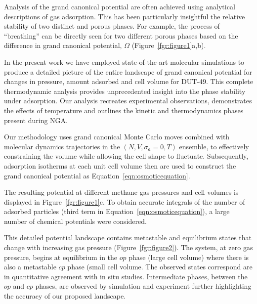\documentclass[journal=jacsat,manuscript=communication]{achemso}
\begin{document}
Analysis of the grand canonical potential are often achieved using analytical descriptions of gas adsorption.
This has been particularly insightful the relative stability of two distinct and porous phases.
For example, the process of ``breathing'' can be directly seen for two different porous phases based on the difference in grand canonical potential, $\Omega$ (Figure~\ref{fgr:figure1}a,b).

In the present work we have employed state-of-the-art molecular simulations to produce a detailed picture of the entire landscape of grand canonical potential for changes in pressure, amount adsorbed and cell volume for DUT-49.
This complete thermodynamic analysis provides unprecedented insight into the phase stability under adsorption.
Our analysis recreates experimental observations, demonstrates the effects of temperature and outlines the kinetic and thermodynamics phases present during NGA.



Our methodology uses grand canonical Monte Carlo moves combined with molecular dynamics trajectories in the $(N,V,\sigma_{a}=0,T)$ ensemble, to effectively constraining the volume while allowing the cell shape to fluctuate. Subsequently, adsorption isotherms at each unit cell volume then are used to construct the grand canonical potential as Equation~{\ref{eqn:osmoticequation}}.


The resulting potential at different methane gas pressures and cell volumes is displayed in Figure~\ref{fgr:figure1}c. To obtain accurate integrals of the number of adsorbed particles (third term in Equation~{\ref{eqn:osmoticequation}}), a large number of chemical potentials were considered.

This detailed potential landscape contains metastable and equilibrium states that change with  increasing gas pressure (Figure~\ref{fgr:figure2}). The system, at zero gas pressure, begins at equilibrium in the $op$ phase (large cell volume) where there is also a metastable $cp$ phase (small cell volume. The observed states correspond are in quantitative agreement with in situ studies.
Intermediate phases, between the $op$ and $cp$ phases, are observed by simulation and experiment further highlighting the accuracy of our proposed landscape.
  
\end{document}
